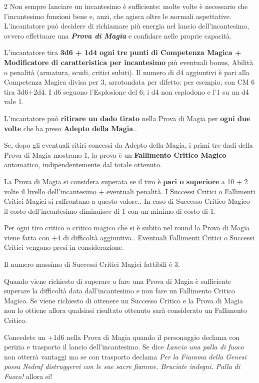 \begin{multicols}{2}
Non sempre lanciare un incantesimo è sufficiente: molte volte è necessario che l'incantesimo funzioni bene e, anzi, che agisca oltre le normali aspettative. L'incantatore può decidere di richiamare più energia nel lancio dell'incantesimo, ovvero effettuare una \emph{\textbf{Prova di Magia}} e confidare nelle proprie capacità.

L'incantatore tira \textbf{3d6 + 1d4 ogni tre punti di Competenza Magica + Modificatore di caratteristica per incantesimo} più eventuali bonus, Abilità o penalità (armatura, scudi, critici subiti). Il numero di d4 aggiuntivi è pari alla Competenza Magica divisa per 3, arrotondata per difetto: per esempio, con CM 6 tira 3d6+2d4. I d6 seguono l'Esplosione del 6; i d4 non esplodono e l'1 su un d4 vale 1.

L'incantatore può \textbf{ritirare un dado tirato} nella Prova di Magia per \textbf{ogni due volte} che ha preso \textbf{Adepto della Magia}..

Se, dopo gli eventuali ritiri concessi da Adepto della Magia, i primi tre dadi della Prova di Magia mostrano 1, la prova è un \textbf{Fallimento Critico Magico} automatico, indipendentemente dal totale ottenuto.

La Prova di Magia si considera superata se il tiro è \textbf{pari o superiore} a 10 + 2 volte il livello dell'incantesimo + eventuali penalità. I Successi Critici o Fallimenti Critici Magici si raffrontano a questo valore.. In caso di Successo Critico Magico il costo dell'incantesimo diminuisce di 1 con un minimo di costo di 1.

Per ogni tiro critico o critico magico che si è subito nel round la Prova di Magia viene fatta con +4 di difficoltà aggiuntiva.. Eventuali Fallimenti Critici o Successi Critici vengono presi in considerazione.

Il numero massimo di Successi Critici Magici fattibili è 3.

Quando viene richiesto di superare o fare una Prova di Magia è sufficiente superare la difficoltà data dall'incantesimo e non fare un Fallimento Critico Magico. Se viene richiesto di ottenere un Successo Critico e la Prova di Magia non lo ottiene allora qualsiasi risultato ottenuto sarà considerato un Fallimento Critico.


\begin{narratore}
Concedete un +1d6 nella Prova di Magia quando il personaggio declama con perizia e trasporto il lancio dell'incantesimo. Se dice \emph{Lancio una palla di fuoco} non otterrà vantaggi ma se con trasporto declama \emph{Per la Fiamma della Genesi possa Nedraf distruggervi con le sue sacre fiamme. Bruciate indegni. Palla di Fuoco!} allora si!


\end{narratore}
\end{multicols}
